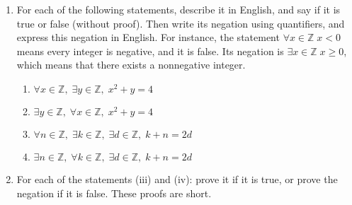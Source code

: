 \documentclass{article}
\newcommand{\Z}{\mathbb{Z}}
\theoremstyle{definition}
\begin{document}
\begin{question}{12}
\begin{enumerate}
	\item For each of the following statements, describe it in English, and say if it is true or false (without proof). Then write its negation using quantifiers, and express this negation in English. For instance, the statement $\forall x \in \Z \; x < 0$ means every integer is negative, and it is false. Its negation is $\exists x \in \Z \; x \geq 0$, which means that there exists a nonnegative integer.
	
	\begin{enumerate}
		\item $\forall x \in \Z, \; \exists y \in \Z, \; x^2 + y = 4$
		\item $\exists y \in \Z, \; \forall x \in \Z, \; x^2 + y = 4$
		\item $\forall n \in \Z, \; \exists k \in \Z, \; \exists d \in \Z, \; k+ n = 2d$
		\item $\exists n \in \Z, \; \forall k \in \Z, \; \exists d \in \Z, \; k+ n = 2d$
	\end{enumerate}
	
	\item For each of the statements (iii) and (iv): prove it if it is true, or prove the negation if it is false. These proofs are short.
\end{enumerate}
\end{question}
\end{document}
